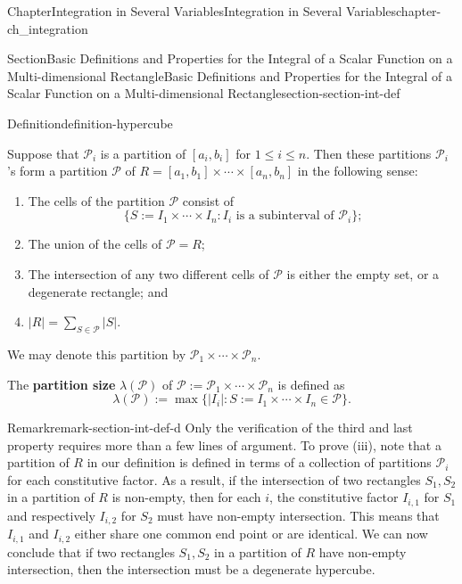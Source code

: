 \documentclass[oneside,10pt,]{book}
\newcommand{\terminology}[1]{\textbf{#1}}
\numberwithin{equation}{section}
\newcommand{\cP}{\mathcal{P}}
\begin{document}
\begin{chapterptx}{Chapter}{Integration in Several Variables}{}{Integration in Several Variables}{}{}{chapter-ch_integration}
\begin{sectionptx}{Section}{Basic Definitions and Properties for the Integral of a Scalar Function on a Multi-dimensional Rectangle}{}{Basic Definitions and Properties for the Integral of a Scalar Function on a Multi-dimensional Rectangle}{}{}{section-section-int-def}
\begin{definition}{Definition}{}{definition-hypercube}
\par
Suppose that \(\cP_{i}\) is a partition of \([a_{i}, b_{i}]\) for \(1\le i \le n\). Then these partitions \(\cP_{i}\)'s form a partition \(\cP\) of \(R=[a_{1}, b_{1}]\times \cdots \times [a_{n}, b_{n}]\) in the following sense:%
\begin{enumerate}[label=(\roman*).]
\item{}The cells of the partition \(\cP\) consist of%
\begin{equation*}
\{S:=I_{1}\times\cdots \times I_{n}: I_{i} \text{ is a subinterval of  } \cP_{i}\}\text{;}
\end{equation*}
%
\item{}The union of the cells of \(\cP =R\);%
\item{}The intersection of any two different cells of \(\cP\)  is either the empty set, or a degenerate rectangle; and%
\item{}\(\vert R\vert=\sum_{S\in \cP}\vert S\vert\).%
\end{enumerate}
We may denote this partition by \(\cP_{1}\times\cdots \times \cP_{n}\).%
\par
The \terminology{partition size} \(\lambda(\cP)\) of \(\cP:=\cP_{1}\times\cdots \times \cP_{n}\) is defined as%
\begin{equation*}
\lambda(\cP) :=\max\{\vert I_{i}\vert: S:=I_{1}\times\cdots\times I_{n} \in \cP\}.
\end{equation*}
%
\end{definition}
\begin{remark}{Remark}{}{remark-section-int-def-d}%
Only the verification of the third and last property requires more than a few lines of argument.  To prove (iii), note that a partition of \(R\) in our definition is defined in terms of a collection of partitions \(\cP_{i}\) for each constitutive factor. As a result, if the intersection of two rectangles \(S_{1}, S_{2}\) in  a partition of \(R\) is non-empty, then for each \(i\), the constitutive factor \(I_{i, 1}\) for \(S_{1}\) and respectively \(I_{i, 2}\) for \(S_{2}\) must have non-empty intersection. This means that \(I_{i, 1}\) and \(I_{i, 2}\) either share one common end point or are identical. We can now conclude that if two rectangles \(S_{1}, S_{2}\) in  a partition of \(R\) have non-empty intersection, then the intersection must be a degenerate hypercube.%
\par

\end{remark}
\end{sectionptx}
\end{chapterptx}
\end{document}
